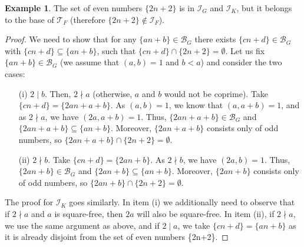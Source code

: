 \documentclass{amsart}
\theoremstyle{definition}
\theoremstyle{definition}
\newtheorem{ex}{Example}
\newcommand{\I}{\mathcal I}
\newcommand{\T}{\mathcal{T}}
\newcommand{\B}{\mathcal{B}}
\begin{document}
\begin{ex} 
The set of even numbers $\{2n+2\}$ is in $\I_G$ and $\I_K$, but it belongs to the base of $\T_F$ (therefore $\{2n+2\}\notin \I_F$).
\end{ex}

\begin{proof}
We need to show that for any $\{an+b\} \in \B_G$ there exists $\{cn+d\} \in \B_G$ with $\{cn+d\} \subseteq \{an+b\}$, such that $\{cn+d\}\cap \{2n+2\} = \emptyset$. Let us fix $\{an+b\} \in \B_G$ (we assume that $(a,b)=1$ and $b<a$) and consider the two cases:
\begin{itemize}
 \item[(i)] $2\mid b$. Then, $2 \nmid a$ (otherwise, $a$ and $b$ would not be coprime). Take $\{cn+d\} = \{2an+a+b\}$. As $(a,b)=1$, we know that $(a,a+b)=1$, and as $2 \nmid a$, we have $(2a,a+b)=1$. Thus, $\{2an+a+b\}\in\B_G$ and $\{2an+a+b\}\subseteq\{an+b\}$. Moreover, $\{2an+a+b\}$ consists only of odd numbers, so $\{2an+a+b\}\cap \{2n+2\} = \emptyset$.
 \item[(ii)] $2\nmid b$. Take $\{cn+d\} = \{2an+b\}$. As $2\nmid b$, we have $(2a,b)=1$. Thus, $\{2an+b\}\in\B_G$ and $\{2an+b\}\subseteq\{an+b\}$. Moreover, $\{2an+b\}$ consists only of odd numbers, so $\{2an+b\}\cap \{2n+2\} = \emptyset$.
\end{itemize}

The proof for $\I_K$ goes similarly. In item (i) we additionally need to observe that if $2 \nmid a$ and $a$ is square-free, then $2a$ will also be square-free. In item (ii), if $2 \nmid a$, we use the same argument as above, and if $2\mid a$, we take $\{cn+d\} = \{an+b\}$ as it is already disjoint from the set of even numbers \{2n+2\}.
\end{proof}
\end{document}
